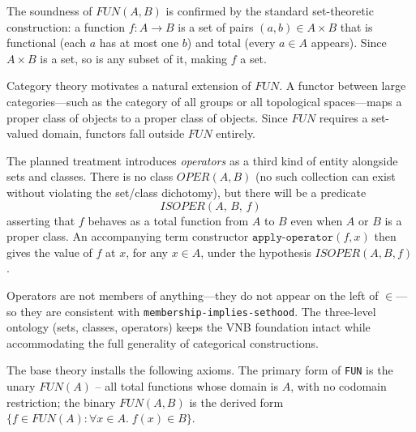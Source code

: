 \begin{remark}
The soundness of $\mathit{FUN}(A,B)$ is confirmed by the standard
set-theoretic construction: a function $f : A \to B$ is a set of pairs
$(a, b) \in A \times B$ that is functional (each $a$ has at most one $b$)
and total (every $a \in A$ appears).  Since $A \times B$ is a set, so
is any subset of it, making $f$ a set.
\end{remark}


\begin{remark}
Category theory motivates a natural extension of $\mathit{FUN}$.  A
functor between large categories---such as the category of all groups or
all topological spaces---maps a proper class of objects to a proper class
of objects.  Since $\mathit{FUN}$ requires a set-valued domain, functors
fall outside $\mathit{FUN}$ entirely.

The planned treatment introduces \emph{operators} as a third kind of
entity alongside sets and classes.  There is no class $\mathit{OPER}(A,B)$
(no such collection can exist without violating the set/class dichotomy),
but there will be a predicate
\[
  \mathit{ISOPER}(A,\, B,\, f)
\]
asserting that $f$ behaves as a total function from $A$ to $B$ even when
$A$ or $B$ is a proper class.  An accompanying term constructor
$\texttt{apply-operator}(f, x)$ then gives the value of $f$ at $x$, for
any $x \in A$, under the hypothesis $\mathit{ISOPER}(A,B,f)$.

Operators are not members of anything---they do not appear on the left of
$\in$---so they are consistent with
\texttt{membership-implies-sethood}.  The three-level ontology (sets,
classes, operators) keeps the VNB foundation intact while accommodating
the full generality of categorical constructions.
\end{remark}

%
The base theory installs the following axioms.  The primary form of
\texttt{FUN} is the unary $\mathit{FUN}(A)$ -- all total functions whose
domain is $A$, with no codomain restriction; the binary $\mathit{FUN}(A,B)$
is the derived form $\{f \in \mathit{FUN}(A) : \forall x \in A.\;f(x) \in B\}$.

